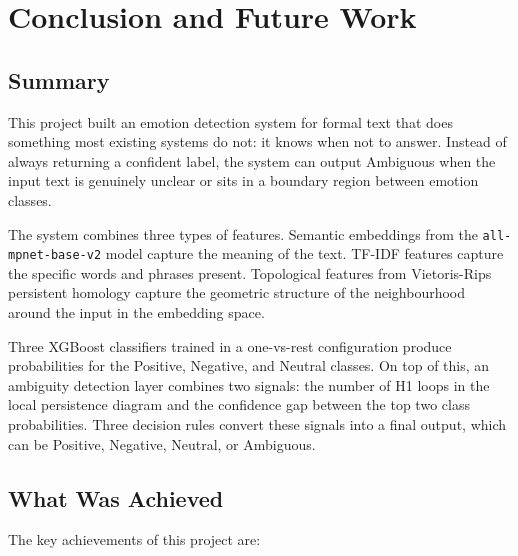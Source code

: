 \chapter{Conclusion and Future Work}
\sloppy

\section{Summary}

This project built an emotion detection system for formal text that does something most
existing systems do not: it knows when not to answer. Instead of always returning a confident
label, the system can output Ambiguous when the input text is genuinely unclear or sits in a
boundary region between emotion classes.

The system combines three types of features. Semantic embeddings from the
\texttt{all-mpnet-\allowbreak base-v2} model capture the meaning of the text. TF-IDF features capture the
specific words and phrases present. Topological features from Vietoris-Rips persistent homology
capture the geometric structure of the neighbourhood around the input in the embedding space.

Three XGBoost classifiers trained in a one-vs-rest configuration produce probabilities for the
Positive, Negative, and Neutral classes. On top of this, an ambiguity detection layer combines
two signals: the number of H1 loops in the local persistence diagram and the confidence gap
between the top two class probabilities. Three decision rules convert these signals into a final
output, which can be Positive, Negative, Neutral, or Ambiguous.

\section{What Was Achieved}

The key achievements of this project are:

